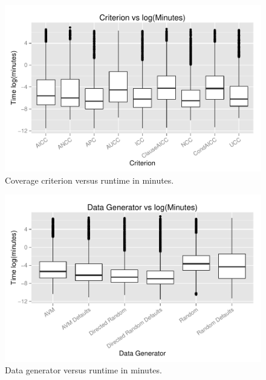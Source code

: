\begin{figure}
\centering
  \centering
  \includegraphics[width=1\linewidth]{diagrams/CriterionvsTime.pdf}
  \caption{Coverage criterion versus runtime in minutes.\vspace{-.15in}}
  \label{fig:crites}
  \vspace{-.15in}
\end{figure}

\begin{figure}
\centering
  \centering
  \includegraphics[width=1\linewidth]{diagrams/DataGeneratorvsTime.pdf}
  \caption{Data generator versus runtime in minutes.\vspace{-.15in}}
  \label{fig:datas}
  \vspace{-.15in}
\end{figure}


